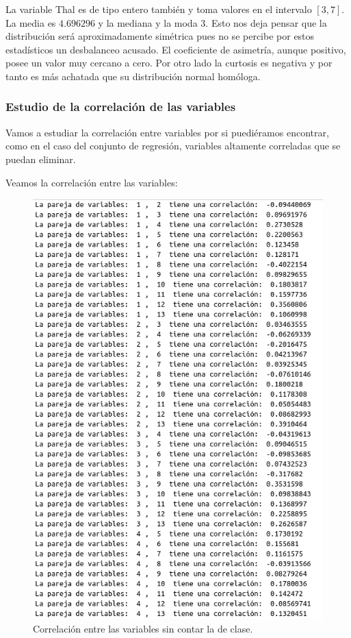 \documentclass[12pt,a4paper]{article}
\begin{document}
La variable Thal es de tipo entero también y toma valores en el intervalo $[3,7]$. La media es $4.696296$ y la mediana y la moda $3$. Esto nos deja pensar que la distribución será aproximadamente simétrica pues no se percibe por estos estadísticos un desbalanceo acusado. El coeficiente de asimetría, aunque positivo, posee un valor muy cercano a cero. Por otro lado la curtosis es negativa y por tanto es más achatada que su distribución normal homóloga.

\subsubsection{Estudio de la correlación de las variables}

Vamos a estudiar la correlación entre variables por si puediéramos encontrar, como en el caso del conjunto de regresión, variables altamente correladas que se puedan eliminar.

Veamos la correlación entre las variables:

\begin{figure}[H]
	\centering
	\includegraphics[scale=0.7]{./Imagenes/EDA/Clasificacion/correlacion_entre_variables1.png}
	\caption{Correlación entre las variables sin contar la de clase.}
\end{figure}
\end{document}

